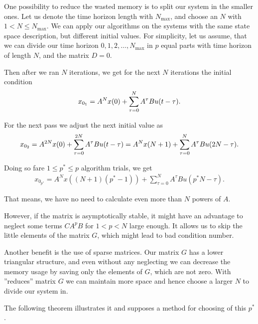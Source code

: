 	One possibility to reduce the wasted memory is to split our system in the smaller ones. Let us denote the time horizon length with $N_{\max}$, and choose an $N$ with $1<N\leq N_{\max}$. 
	We can apply our algorithms on the systems with the same state space description, but different initial values. For simplicity, let us assume, that we can divide our time horizon $0,1,2,\dots, N_{\max}$ in $p$ equal parts with time horizon of length $N$, and the matrix $D = 0$. 
	
	Then after we ran $N$ iterations, we get for the next $N$ iterations the initial condition
	\begin{align}
	x_{0_{\rm{1}}} = A^{N} x(0) + \sum_{\tau = 0}^N A^{\tau}B u(t - \tau). 
	\end{align}
	
	For the next pass we adjust the next initial value as 
	\begin{align}
	x_{0_{\rm{2}}} = A^{2N} x(0) + \sum_{\tau = 0}^{2N} A^{\tau}B u(t - \tau) = A^N x(N+1) + \sum_{\tau = 0}^N A^{\tau} B u(2N - \tau). 
	\end{align}
	
	Doing so fare $1 \leq p^* \leq p$ algorithm trials, we get 
	\begin{align}
	\label{eq:Appl:new_x0}
	x_{0_{p^*}} = A^N x((N+1)(p^* - 1)) + \sum_{\tau = 0}^N A^{\tau}B u(p^*N - \tau). 
	\end{align}
	
	That means, we have no need to calculate even more than $N$ powers of $A$. 
	
	However, if the matrix is asymptotically stable, it might have an advantage to neglect some terms $C A^p B$ for $1<p<N$ large enough. 
	It allows us to skip the little elements of the matrix $G$, which might lead to bad condition number. 

	Another benefit is the use of sparse matrices. 	
	Our matrix $G$ has a lower triangular structure, and even without any neglecting we can decrease the memory usage by saving only the elements of $G$, which are not zero. With ''reduces'' matrix $G$ we can maintain more space and hence choose a larger $N$ to divide our system in.
	
	The following theorem illustrates it and supposes a method for choosing of this $p^*$. 
	
